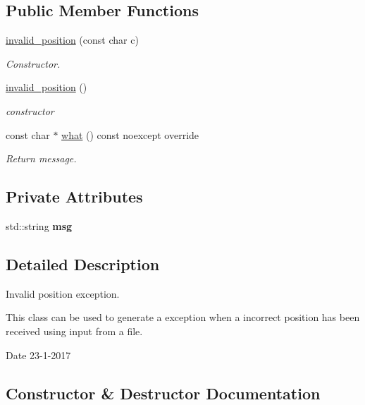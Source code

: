 \subsection*{Public Member Functions}
\begin{DoxyCompactItemize}
\item 
\hyperlink{classinvalid__position_a3d39f52e55d28fe6e9b4af02b7c6f278}{invalid\+\_\+position} (const char c)
\begin{DoxyCompactList}\small\item\em Constructor. \end{DoxyCompactList}\item 
\hyperlink{classinvalid__position_aabeae0fae84fada6af68ff83a68c6542}{invalid\+\_\+position} ()
\begin{DoxyCompactList}\small\item\em constructor \end{DoxyCompactList}\item 
const char $\ast$ \hyperlink{classinvalid__position_a7de16130368fed8546deef6713025cfa}{what} () const noexcept override
\begin{DoxyCompactList}\small\item\em Return message. \end{DoxyCompactList}\end{DoxyCompactItemize}
\subsection*{Private Attributes}
\begin{DoxyCompactItemize}
\item 
\mbox{\label{classinvalid__position_a53d057adf627ad9d7942a3233bca9028}} 
std\+::string {\bfseries msg}
\end{DoxyCompactItemize}


\subsection{Detailed Description}
Invalid position exception. 

This class can be used to generate a exception when a incorrect position has been received using input from a file.

\begin{DoxyDate}{Date}
23-\/1-\/2017 
\end{DoxyDate}


\subsection{Constructor \& Destructor Documentation}
\mbox{\label{classinvalid__position_a3d39f52e55d28fe6e9b4af02b7c6f278}} 
